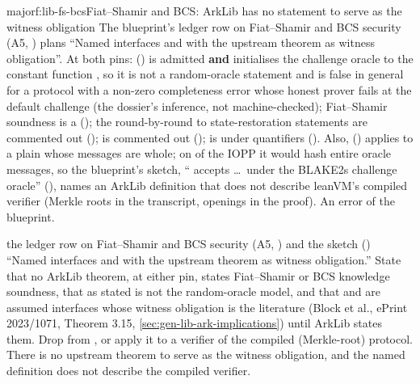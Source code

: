 \begin{finding}{major}{f:lib-fs-bcs}{Fiat--Shamir and BCS: ArkLib has no statement to serve as the witness obligation}
 The blueprint's ledger row on Fiat--Shamir and BCS security (A5, ) plans \enquote{Named interfaces
 and  with the upstream theorem as witness obligation}.
At both pins:  (\allowbreak{}) is admitted
\textbf{and} initialises the challenge oracle to the constant function
, so it is not a random-oracle statement and is false in general for a
protocol with a non-zero completeness error whose honest prover fails at the default challenge
(the dossier's inference, not machine-checked); Fiat--Shamir soundness is a 
(); the round-by-round to state-restoration statements are commented out
();  is commented out ();
 is  under quantifiers
(\allowbreak{}\allowbreak{}). Also, 
(\allowbreak{}) applies to a plain  whose messages are whole;
on  of the IOPP it would hash entire oracle messages, so the blueprint's
 sketch, \enquote{\allowbreak{}\allowbreak{}
accepts \dots\ under the BLAKE2s challenge oracle} (), names an ArkLib definition
that does not describe leanVM's compiled verifier (Merkle roots in the transcript, openings in the
proof).
 An error of the blueprint.
\begin{change}{the ledger row on Fiat--Shamir and BCS security (A5, ) and the  sketch ()}
\asis \enquote{Named interfaces  and  with the upstream
theorem as witness obligation.}
\asproposed State that no ArkLib theorem, at either pin, states Fiat--Shamir or BCS knowledge
soundness, that  as stated is not the random-oracle model, and that
 and  are assumed interfaces whose witness obligation is
the literature (Block et al., ePrint 2023/1071, Theorem 3.15, \cref{sec:gen-lib-ark-implications})
until ArkLib states them. Drop  from , or apply
it to a verifier of the compiled (Merkle-root) protocol.
\reason There is no upstream theorem to serve as the witness obligation, and the named definition
does not describe the compiled verifier.
\end{change}
\end{finding}

